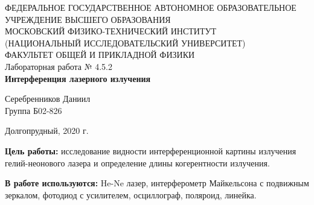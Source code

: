 \documentclass[a4paper,12pt]{article} %
\begin{document}
\begin{center}
	\footnotesize{ФЕДЕРАЛЬНОЕ ГОСУДАРСТВЕННОЕ АВТОНОМНОЕ ОБРАЗОВАТЕЛЬНОЕ 			УЧРЕЖДЕНИЕ ВЫСШЕГО ОБРАЗОВАНИЯ}\\
	\footnotesize{МОСКОВСКИЙ ФИЗИКО-ТЕХНИЧЕСКИЙ ИНСТИТУТ\\(НАЦИОНАЛЬНЫЙ 			ИССЛЕДОВАТЕЛЬСКИЙ УНИВЕРСИТЕТ)}\\
	\footnotesize{ФАКУЛЬТЕТ ОБЩЕЙ И ПРИКЛАДНОЙ ФИЗИКИ\\}
	\hfill \break
	\hfill\break
	\hfill\break
	\hfill \break
	\hfill \break
	\hfill \break
	\hfill \break
	\hfill \break
	\hfill \break
	\hfill \break
	\hfill \break
	\hfill \break
	\hfill \break
	\hfill \break
	\large{Лабораторная работа № 4.5.2 \\\textbf{Интерференция лазерного излучения}}\\
	\hfill \break
	\hfill \break
	\hfill \break
	\begin{flushright}
		Серебренников Даниил\\
		Группа Б02-826
	\end{flushright}
	\hfill \break
	\hfill \break
	\hfill \break
	\hfill \break
	\hfill \break
	\hfill \break
	\hfill \break
	\hfill \break
	\hfill \break
	\hfill \break
	\hfill \break
\end{center}
\begin{center}
	Долгопрудный, 2020 г.
\end{center}
\thispagestyle{empty}
\newpage
\textbf{Цель работы:} исследование видности интерференционной картины излучения гелий-неонового лазера и определение длины когерентности излучения.

\textbf{В работе используются:} He-Ne лазер, интерферометр Майкельсона с подвижным зеркалом, фотодиод с усилителем, осциллограф, поляроид, линейка.
\end{document}
